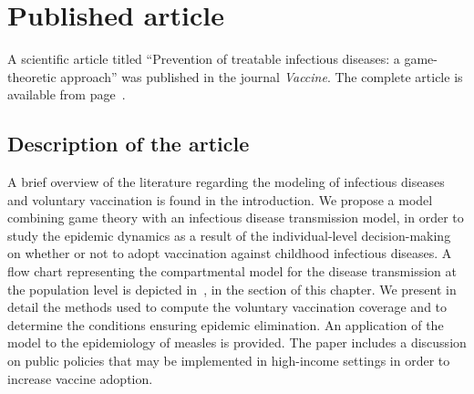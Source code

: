 %

\section{Published article}
\label{Vaccine:Article}

A scientific article titled ``Prevention of treatable infectious diseases: a game-theoretic approach'' \cite[]{Jijon2017} was published in the journal \textit{Vaccine}. The complete article is available from page~\pageref{articlepdf:1}.

\subsection{Description of the article}
A brief overview of the literature regarding the modeling of infectious diseases and voluntary vaccination is found in the introduction. We propose a model combining game theory with an infectious disease transmission model, in order to study the epidemic dynamics as a result of the individual-level decision-making on whether or not to adopt vaccination against childhood infectious diseases. A flow chart representing the compartmental model for the disease transmission at the population level is depicted in~, in the  section of this chapter. 
%  
We present in detail the methods used to compute the voluntary vaccination coverage and to determine the conditions ensuring epidemic elimination. 
An application of the model to the epidemiology of measles is provided. The paper includes a discussion on public policies that may be implemented in high-income settings in order to increase vaccine adoption.

